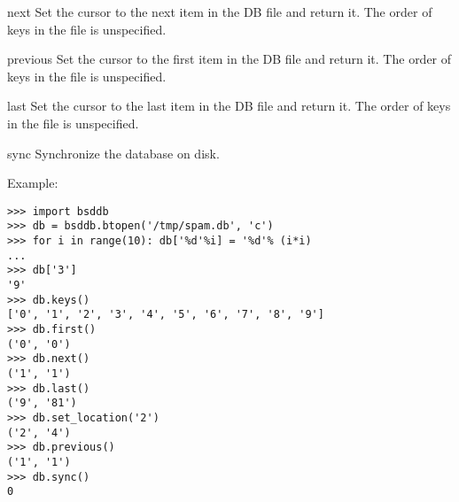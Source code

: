 \begin{methoddesc}{next}{}
Set the cursor to the next item in the DB file and return it.  The order of 
keys in the file is unspecified.
\end{methoddesc}

\begin{methoddesc}{previous}{}
Set the cursor to the first item in the DB file and return it.  The order of 
keys in the file is unspecified.
\end{methoddesc}

\begin{methoddesc}{last}{}
Set the cursor to the last item in the DB file and return it.  The order of 
keys in the file is unspecified.
\end{methoddesc}

\begin{methoddesc}{sync}{}
Synchronize the database on disk.
\end{methoddesc}

Example:

\begin{verbatim}
>>> import bsddb
>>> db = bsddb.btopen('/tmp/spam.db', 'c')
>>> for i in range(10): db['%d'%i] = '%d'% (i*i)
... 
>>> db['3']
'9'
>>> db.keys()
['0', '1', '2', '3', '4', '5', '6', '7', '8', '9']
>>> db.first()
('0', '0')
>>> db.next()
('1', '1')
>>> db.last()
('9', '81')
>>> db.set_location('2')
('2', '4')
>>> db.previous() 
('1', '1')
>>> db.sync()
0
\end{verbatim}
